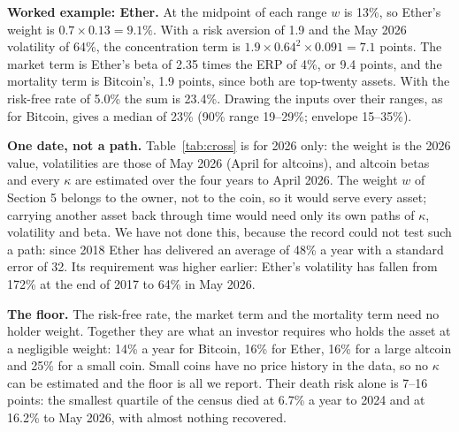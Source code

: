 \documentclass[11pt]{article}
\begin{document}
\textbf{Worked example: Ether.} At the midpoint of each range $w$ is 13\%, so Ether's weight is $0.7 \times 0.13 = 9.1\%$. With a risk aversion of 1.9 and the May 2026 volatility of 64\%, the concentration term is $1.9 \times 0.64^2 \times 0.091 = 7.1$ points. The market term is Ether's beta of 2.35 times the ERP of 4\%, or 9.4 points, and the mortality term is Bitcoin's, 1.9 points, since both are top-twenty assets. With the risk-free rate of 5.0\% the sum is 23.4\%. Drawing the inputs over their ranges, as for Bitcoin, gives a median of 23\% (90\% range 19--29\%; envelope 15--35\%).

\textbf{One date, not a path.} Table~\ref{tab:cross} is for 2026 only: the weight is the 2026 value, volatilities are those of May 2026 (April for altcoins), and altcoin betas and every $\kappa$ are estimated over the four years to April 2026. The weight $w$ of Section 5 belongs to the owner, not to the coin, so it would serve every asset; carrying another asset back through time would need only its own paths of $\kappa$, volatility and beta. We have not done this, because the record could not test such a path: since 2018 Ether has delivered an average of 48\% a year with a standard error of 32. Its requirement was higher earlier: Ether's volatility has fallen from 172\% at the end of 2017 to 64\% in May 2026.

\textbf{The floor.} The risk-free rate, the market term and the mortality term need no holder weight. Together they are what an investor requires who holds the asset at a negligible weight: 14\% a year for Bitcoin, 16\% for Ether, 16\% for a large altcoin and 25\% for a small coin. Small coins have no price history in the data, so no $\kappa$ can be estimated and the floor is all we report. Their death risk alone is 7--16 points: the smallest quartile of the census died at 6.7\% a year to 2024 and at 16.2\% to May 2026, with almost nothing recovered.
\end{document}
